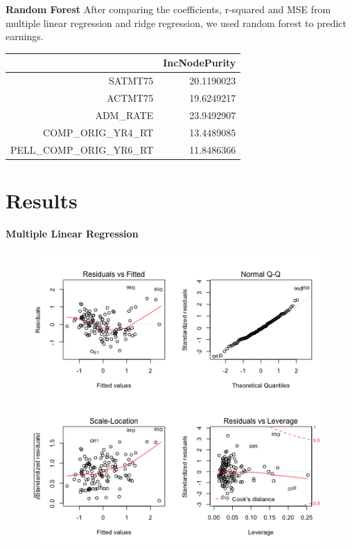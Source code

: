 \documentclass{article}
\begin{document}
\textbf{Random Forest} \newline
After comparing the coefficients, r-squared and MSE from multiple linear regression and ridge regression, we used random forest to predict earnings. 

\begin{table}[ht]
\centering
\begin{tabular}{rr}
  \hline
 & IncNodePurity \\ 
  \hline
SATMT75 & 20.1190023 \\ 
  ACTMT75 & 19.6249217 \\ 
  ADM\_RATE & 23.9492907 \\ 
  COMP\_ORIG\_YR4\_RT & 13.4489085 \\ 
  PELL\_COMP\_ORIG\_YR6\_RT & 11.8486366 \\ 
   \hline
\end{tabular}
\end{table}



\section{Results}

\textbf{Multiple Linear Regression}\newline

\begin{figure}[h!]
\includegraphics{../images/lm_top.png}
\end{figure}
\end{document}
